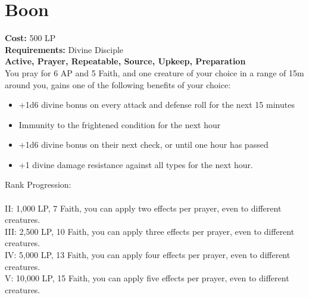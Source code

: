 \section{Boon}\label{prayer:boon}
\textbf{Cost:} 500 LP\\
\textbf{Requirements:} Divine Disciple \\
\textbf{Active, Prayer, Repeatable, Source, Upkeep, Preparation}\\
You pray for 6 AP and 5 Faith, and one creature of your choice in a range of 15m around you, gains one of the following benefits of your choice:
\begin{itemize}
	\item +1d6 divine bonus on every attack and defense roll for the next 15 minutes
	\item Immunity to the frightened condition for the next hour
	\item +1d6 divine bonus on their next check, or until one hour has passed
	\item +1 divine damage resistance against all types for the next hour.
\end{itemize}

Rank Progression:\\
\\
II: 1,000 LP, 7 Faith, you can apply two effects per prayer, even to different creatures.\\
III: 2,500 LP, 10 Faith, you can apply three effects per prayer, even to different creatures.\\
IV: 5,000 LP, 13 Faith, you can apply four effects per prayer, even to different creatures.\\
V: 10,000 LP, 15 Faith, you can apply five effects per prayer, even to different creatures.\\